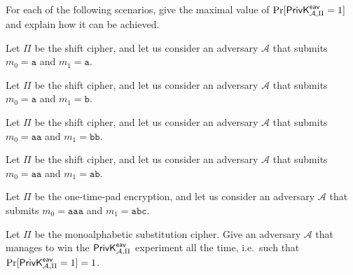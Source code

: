 \documentclass[a4paper,10pt,landscape,twocolumn]{scrartcl}
\begin{document}
\begin{exercise}
For each of the following scenarios, give the maximal value of $\Pr[\mathsf{PrivK}^{\mathsf{eav}}_{\mathcal{A},\Pi}=1]$ and explain how it can be achieved.

\begin{subex}
Let $\Pi$ be the shift cipher, and let us consider an adversary $\mathcal{A}$ that submits $m_0 = \mathtt{a}$ and $m_1 = \mathtt{a}$. 
\end{subex}

\begin{subex}
Let $\Pi$ be the shift cipher, and let us consider an adversary $\mathcal{A}$ that submits $m_0 = \mathtt{a}$ and $m_1 = \mathtt{b}$. 
\end{subex}

\begin{subex}
Let $\Pi$ be the shift cipher, and let us consider an adversary $\mathcal{A}$ that submits $m_0 = \mathtt{aa}$ and $m_1 = \mathtt{bb}$. 
\end{subex}

\begin{subex}
Let $\Pi$ be the shift cipher, and let us consider an adversary $\mathcal{A}$ that submits $m_0 = \mathtt{aa}$ and $m_1 = \mathtt{ab}$. 
\end{subex}

\begin{subex}
Let $\Pi$ be the one-time-pad encryption, and let us consider an adversary $\mathcal{A}$ that submits $m_0 = \mathtt{aaa}$ and $m_1 = \mathtt{abc}$. 
\end{subex}

\begin{subex}
Let $\Pi$ be the monoalphabetic substitution cipher. Give an adversary $\mathcal{A}$ that manages to win the $\mathsf{PrivK}^{\mathsf{eav}}_{\mathcal{A},\Pi}$ experiment all the time, i.e.\ such that $\Pr[\mathsf{PrivK}^{\mathsf{eav}}_{\mathcal{A},\Pi}=1] = 1$.
\end{subex}
\end{exercise}
\end{document}
